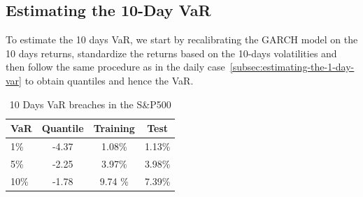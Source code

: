 \documentclass[11pt]{article}
\begin{document}
    \subsection{Estimating the 10-Day VaR}
    To estimate the 10 days VaR, we start by recalibrating the GARCH model on the 10 days returns,
    standardize the returns based on the 10-days volatilities and then follow the same procedure as in the daily case~\ref{subsec:estimating-the-1-day-var} to obtain quantiles and hence the VaR\@.

    \begin{table}[h!]
        \centering
        \begin{tabular}{l|ccc}
              \textbf{VaR}   & \textbf{Quantile} & \textbf{Training} & \textbf{Test} \\
              \hline
              1\%   & -4.37   & 1.08\% & 1.13\% \\
              5\%   & -2.25   & 3.97\% & 3.98\% \\
              10\%  & -1.78   & 9.74 \% & 7.39\% \\
        \end{tabular}
        \caption{10 Days VaR breaches in the S\&P500}
        \label{tab:direct_10d_var_breaches}
    \end{table}
\end{document}
